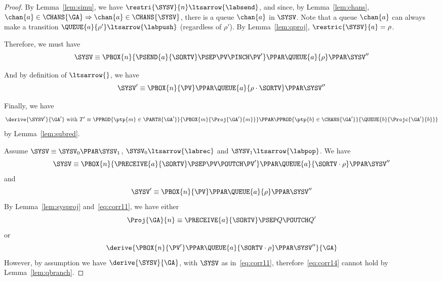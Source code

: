 \begin{proof}
By Lemma~\ref{lem:simu}, we have $\restri{\SYSV}{n} \ltsarrow{\labsend}$,
and since, by Lemma~\ref{lem:chans}, $\chan{a} \in \CHANS{\GA} \Rightarrow \chan{a} \in \CHANS{\SYSV}$, there is a queue $\chan{a}$ in $\SYSV$. Note that a queue $\chan{a}$ can always make
a transition $\QUEUE{a}{\rho'} \ltsarrow{\labpush}$ (regardless of $\rho'$).
By Lemma~\ref{lem:qproj}, $\restric{\SYSV}{a} = \rho$.

Therefore, we must have
\begin{equation}
  \label{eq:corrb}
  \SYSV \equiv
  \PBOX{n}{\PSEND{a}{\SORTV} \PSEP \PV \PINCH \PV'} \PPAR
  \QUEUE{a}{\rho} \PPAR \SYSV''
\end{equation}

And by definition of $\ltsarrow{}$, we have
\begin{equation}
  \label{eq:corrc}
  \SYSV' \equiv
  \PBOX{n}{\PV} \PPAR
   \QUEUE{a}{\rho \cdot \SORTV } \PPAR \SYSV''
\end{equation}

Finally, we have
\begin{equation}
  \label{eq:corrd}
  \derive{\SYSV'}{\GA'}
  \text{ with }
  T' \equiv
  \PPROD{\ptp{m} \in \PARTS{\GA'}}{\PBOX{m}{\Proj{\GA'}{m}}} \PPAR
  \PPROD{\ptp{b} \in \CHANS{\GA'}}{\QUEUE{b}{\Projc{\GA'}{b}}}
\end{equation}
by Lemma~\ref{lem:subred}.

Assume $\SYSV \equiv \SYSV_0 \PPAR \SYSV_1$,
$\SYSV_0 \ltsarrow{\labrec}$ and
$\SYSV_1 \ltsarrow{\labpop}$.
We have
\begin{equation}\label{eq:corr11}
  \SYSV \equiv \PBOX{n}{\PRECEIVE{a}{\SORTV} \PSEP \PV \POUTCH \PV'}
  \PPAR \QUEUE{a}{\SORTV \cdot \rho}
  \PPAR \SYSV''
\end{equation}
and 
\begin{equation}\label{eq:corr12}
  \SYSV' \equiv \PBOX{n}{\PV}
  \PPAR \QUEUE{a}{\rho}
  \PPAR \SYSV''
\end{equation}
By Lemma~\ref{lem:sysproj} and~\eqref{eq:corr11}, we have either
\begin{equation}
  \label{eq:corr13}
  \Proj{\GA}{n} \equiv \PRECEIVE{a}{\SORTV} \PSEP Q \POUTCH Q'
\end{equation}
or
\begin{equation}
  \label{eq:corr14}
  \derive{
    \PBOX{n}{\PV'}
    \PPAR \QUEUE{a}{\SORTV \cdot \rho}
    \PPAR \SYSV''
  }
  {\GA}
\end{equation}
However, by assumption we have $\derive{\SYSV}{\GA}$, with $\SYSV$ as in~\eqref{eq:corr11},
therefore~\eqref{eq:corr14} cannot hold by Lemma~\ref{lem:qbranch}.


\end{proof}
